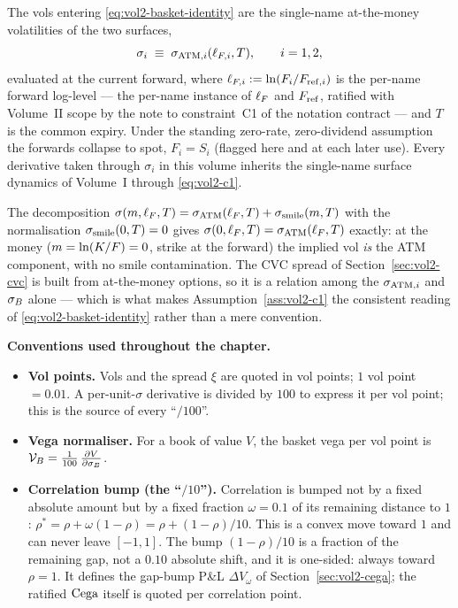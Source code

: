 \begin{assumption}
\label{ass:vol2-c1}
The vols entering \eqref{eq:vol2-basket-identity} are the single-name
at-the-money volatilities of the two surfaces,
\begin{equation}
\sigma_i \;\equiv\; \sigma_{\mathrm{ATM},i}(\ell_{F,i}, T), \qquad i = 1, 2,
\label{eq:vol2-c1}
\end{equation}
evaluated at the current forward, where $\ell_{F,i} := \ln(F_i/F_{\mathrm{ref},i})$
is the per-name forward log-level --- the per-name instance of $\ell_F$ and
$F_{\mathrm{ref}}$, ratified with Volume~II scope by the note to constraint~C1 of the
notation contract --- and $T$ is the common expiry. Under the standing
zero-rate, zero-dividend assumption the forwards collapse to spot,
$F_i = S_i$ (flagged here and at each later use). Every derivative taken
through $\sigma_i$ in this volume inherits the single-name surface dynamics
of Volume~I through \eqref{eq:vol2-c1}.
\end{assumption}

\begin{remark}
\label{rem:vol2-why-atm}
The decomposition $\sigma(m, \ell_F, T) = \sigma_{\mathrm{ATM}}(\ell_F, T) + \sigma_{\mathrm{smile}}(m, T)$ with
the normalisation $\sigma_{\mathrm{smile}}(0, T) = 0$ gives $\sigma(0, \ell_F, T) = \sigma_{\mathrm{ATM}}(\ell_F, T)$
exactly: at the money ($m = \ln(K/F) = 0$, strike at the forward) the
implied vol \emph{is} the ATM component, with no smile contamination. The
CVC spread of Section~\ref{sec:vol2-cvc} is built from at-the-money options,
so it is a relation among the $\sigma_{\mathrm{ATM},i}$ and $\sigma_B$ alone --- which is what
makes Assumption~\ref{ass:vol2-c1} the consistent reading of
\eqref{eq:vol2-basket-identity} rather than a mere convention.
\end{remark}

\textbf{Conventions used throughout the chapter.}
\begin{itemize}[leftmargin=1.5em]
\item \textbf{Vol points.} Vols and the spread $\xi$ are quoted in vol points;
      $1$ vol point $= 0.01$. A per-unit-$\sigma$ derivative is divided by
      $100$ to express it per vol point; this is the source of every
      ``$/100$''.
\item \textbf{Vega normaliser.} For a book of value $V$, the basket vega per
      vol point is $\mathcal{V}_B = \tfrac1{100}\,\frac{\partial V}{\partial \sigma_B}$.
\item \textbf{Correlation bump (the ``$/10$'').} Correlation is bumped not by
      a fixed absolute amount but by a fixed fraction $\omega = 0.1$ of its
      remaining distance to $1$:
      $\rho^{*} = \rho + \omega(1 - \rho) = \rho + (1-\rho)/10$. This is a
      convex move toward $1$ and can never leave $[-1,1]$. The bump
      $(1-\rho)/10$ is a fraction of the remaining gap, not a $0.10$
      absolute shift, and it is one-sided: always toward $\rho = 1$. It
      defines the gap-bump P\&L $\Delta V_{\omega}$ of
      Section~\ref{sec:vol2-cega}; the ratified $\mathrm{Cega}$ itself is quoted
      per correlation point.
\end{itemize}

